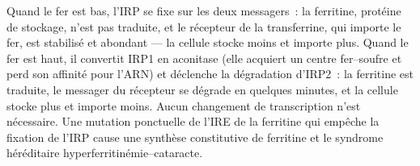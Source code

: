 \begin{example}\label{ex:b3:rna-regulation:iron}
Quand le fer est bas, l'IRP se fixe sur les deux messagers~: la
ferritine, protéine de stockage, n'est pas traduite, et le récepteur de
la transferrine, qui importe le fer, est stabilisé et abondant --- la
cellule stocke moins et importe plus. Quand le fer est haut, il
convertit IRP1 en aconitase (elle acquiert un centre fer--soufre et
perd son affinité pour l'ARN) et déclenche la dégradation d'IRP2~: la
ferritine est traduite, le messager du récepteur se dégrade en quelques
minutes, et la cellule stocke plus et importe moins. Aucun changement
de transcription n'est nécessaire. Une mutation ponctuelle de l'IRE de
la ferritine qui empêche la fixation de l'IRP cause une synthèse
constitutive de ferritine et le syndrome héréditaire
hyperferritinémie--cataracte.
\end{example}

